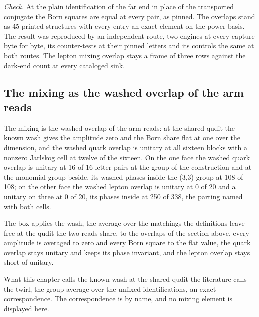 \begin{chproof}
\emph{Check.} At the plain identification of the far end in place of the transported conjugate the Born squares are equal at every pair, as pinned. The overlaps stand as 45 printed structures with every entry an exact element on the power basis. The result was reproduced by an independent route, two engines at every capture byte for byte, its counter-tests at their pinned letters and its controls the same at both routes.
The lepton mixing overlap stays a frame of three rows against the dark-end count at every cataloged sink.
\end{chproof}
\label{chend:VI-7-D536241-w-mxso}
\subsection{The mixing as the washed overlap of the arm reads}\label{mod:VI-7-D538551-w-mxws}
\begin{chwall}\label{box:VI-7-D538551-w-mxws:1}
The mixing is the washed overlap of the arm reads: at the shared qudit the known wash gives the amplitude zero and the Born share flat at one over the dimension, and the washed quark overlap is unitary at all sixteen blocks with a nonzero Jarlskog cell at twelve of the sixteen. On the one face the washed quark overlap is unitary at 16 of 16 letter pairs at the group of the construction and at the monomial group beside, its washed phases inside the (3,3) group at 108 of 108; on the other face the washed lepton overlap is unitary at 0 of 20 and a unitary on three at 0 of 20, its phases inside at 250 of 338, the parting named with both cells.
\end{chwall}
The box applies the wash, the average over the matchings the definitions leave free at the qudit the two reads share, to the overlaps of the section above, every amplitude is averaged to zero and every Born square to the flat value, the quark overlap stays unitary and keeps its phase invariant, and the lepton overlap stays short of unitary.
\begin{chbridge}
What this chapter calls the known wash at the shared qudit the literature calls the twirl, the group average over the unfixed identifications, an exact correspondence. The correspondence is by name, and no mixing element is displayed here.
\end{chbridge}
